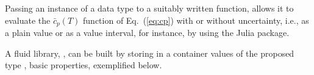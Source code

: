     Passing an instance of a  data type to a suitably written function, allows it to evaluate the $\bar{c}_p(T)$ function of Eq.~(\ref{eq:cp}) with or without uncertainty, i.e.,  as
    a plain value or as a value interval, for instance, by using the  Julia package.

    A fluid library, , can be built by storing in a container values of the proposed type , basic properties, exemplified below.


